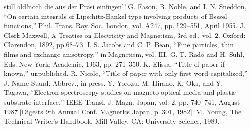 \documentclass[conference]{IEEEtran}
\begin{document}
\begin{thebibliography}{00}





still old!noch die aus der Präsi einfügen'! G. Eason, B. Noble, and I. N. Sneddon, ``On certain integrals of Lipschitz-Hankel type involving products of Bessel functions,'' Phil. Trans. Roy. Soc. London, vol. A247, pp. 529--551, April 1955.
 J. Clerk Maxwell, A Treatise on Electricity and Magnetism, 3rd ed., vol. 2. Oxford: Clarendon, 1892, pp.68--73.
 I. S. Jacobs and C. P. Bean, ``Fine particles, thin films and exchange anisotropy,'' in Magnetism, vol. III, G. T. Rado and H. Suhl, Eds. New York: Academic, 1963, pp. 271--350.
 K. Elissa, ``Title of paper if known,'' unpublished.
 R. Nicole, ``Title of paper with only first word capitalized,'' J. Name Stand. Abbrev., in press.
 Y. Yorozu, M. Hirano, K. Oka, and Y. Tagawa, ``Electron spectroscopy studies on magneto-optical media and plastic substrate interface,'' IEEE Transl. J. Magn. Japan, vol. 2, pp. 740--741, August 1987 [Digests 9th Annual Conf. Magnetics Japan, p. 301, 1982].
 M. Young, The Technical Writer's Handbook. Mill Valley, CA: University Science, 1989.
\end{thebibliography}
\end{document}
